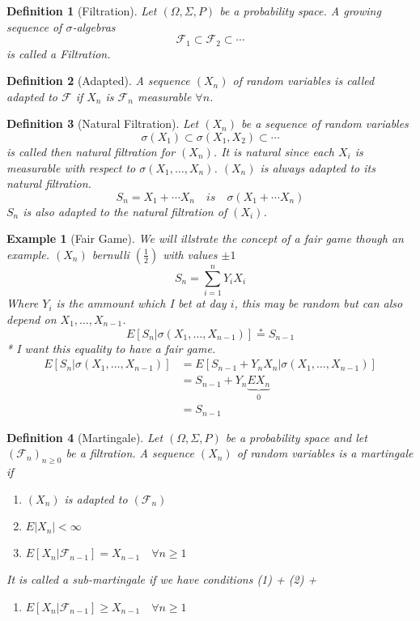 \documentclass[12pt]{article}
\def\FF{\mathbb{F}}
\def\FF{\mathcal{F}}
\newtheorem{definition}{Definition}[section]
\newtheorem{example}{Example}[section]
\begin{document}
\begin{definition}[Filtration]
Let $(\Omega, \Sigma, P)$ be a probability space. A growing sequence of $\sigma$-algebras 
\[\FF_1 \subset \FF_2 \subset \cdots \]
is called a Filtration. 
\end{definition}

\begin{definition}[Adapted]
A sequence $(X_n)$ of random variables is called adapted to $\FF$ if $X_n$ is $\FF_n$ measurable $\forall n$. 
\end{definition}

\begin{definition}[Natural Filtration] Let $(X_n)$ be a sequence of random variables 
\[\sigma(X_1) \subset \sigma(X_1, X_2) \subset \cdots \]
is called then natural filtration for $(X_n)$. It is natural since each $X_i$ is measurable with respect to $\sigma(X_1, \dots, X_n)$. $(X_n)$ is always adapted to its natural filtration.
\[S_n = X_1 + \cdots X_n \quad is \quad \sigma( X_1 + \cdots X_n) \]
$S_n$ is also adapted to the natural filtration of $(X_i)$.
\end{definition}

\begin{example}[Fair Game]
We will illstrate the concept of a fair game though an example.
$(X_n)$ bernulli $(\tfrac{1}{2})$ with values $\pm 1$
\[S_n = \sum_{i=1}^{n}Y_iX_i \]
Where $Y_i$ is the ammount which I bet at day $i$, this may be random but can also depend on $X_1, \dots , X_{n-1}$.
\[E[S_n |\sigma(X_1, \dots , X_{n-1})] \overset{*}{=} S_{n-1}\]
* I want this equality to have a fair game. 
\begin{align*}
E[S_n |\sigma(X_1, \dots , X_{n-1})] &= E[S_{n-1} + Y_nX_n |\sigma(X_1, \dots , X_{n-1})] \\
&= S_{n-1} + Y_n\underbrace{EX_n}_{0}\\ &= S_{n-1} \end{align*}
\end{example}

\begin{definition}[Martingale]
Let $(\Omega, \Sigma, P)$ be a probability space and let $(\FF_n)_{n \geq 0}$  be a filtration. A sequence $(X_n)$ of random variables is a martingale if 
\begin{enumerate}[(1)]
\item $(X_n)$ is adapted to $(\FF_n)$
\item $E|X_n| < \infty$
\item $E[X_n|\FF_{n-1}] = X_{n-1} \quad \forall n \geq 1$
\end{enumerate}
It is called a sub-martingale if we have conditions (1) + (2) +
\begin{enumerate}[(3*)]
\item $E[X_n|\FF_{n-1}] \geq X_{n-1} \quad \forall n \geq 1$
\end{enumerate}
\end{definition}
 
\end{document}
